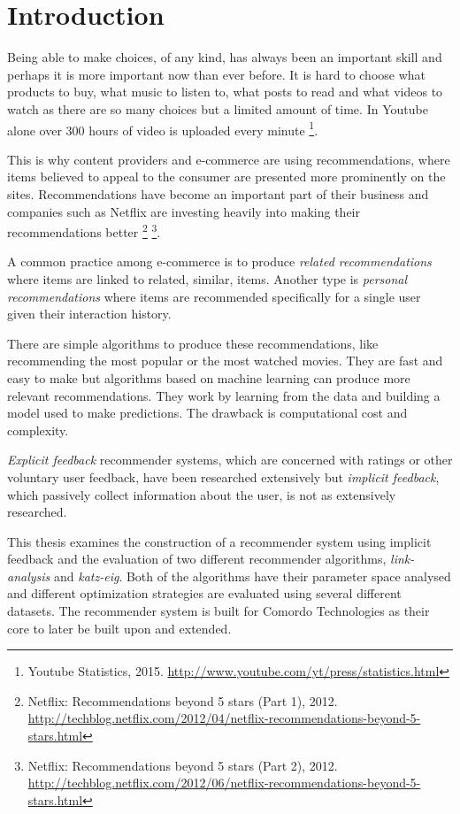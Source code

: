 
\section{Introduction}\label{sec:intro:intro}

Being able to make choices, of any kind, has always been an important skill and perhaps it is more important now than ever before. It is hard to choose what products to buy, what music to listen to, what posts to read and what videos to watch as there are so many choices but a limited amount of time. In Youtube alone over 300 hours of video is uploaded every minute
\footnote{Youtube Statistics, 2015. \url{http://www.youtube.com/yt/press/statistics.html}}.

This is why content providers and e-commerce are using recommendations, where items believed to appeal to the consumer are presented more prominently on the sites. Recommendations have become an important part of their business and companies such as Netflix are investing heavily into making their recommendations better
\footnote{
Netflix: Recommendations beyond 5 stars (Part 1), 2012.
\url{http://techblog.netflix.com/2012/04/netflix-recommendations-beyond-5-stars.html}
}
\footnote{
Netflix: Recommendations beyond 5 stars (Part 2), 2012.
\url{http://techblog.netflix.com/2012/06/netflix-recommendations-beyond-5-stars.html}
}.

A common practice among e-commerce is to produce \textit{related recommendations} where items are linked to related, similar, items. Another type is \textit{personal recommendations} where items are recommended specifically for a single user given their interaction history.

There are simple algorithms to produce these recommendations, like recommending the most popular or the most watched movies. They are fast and easy to make but algorithms based on machine learning can produce more relevant recommendations. They work by learning from the data and building a model used to make predictions. The drawback is computational cost and complexity.

\textit{Explicit feedback} recommender systems, which are concerned with ratings or other voluntary user feedback, have been researched extensively but \textit{implicit feedback}, which passively collect information about the user, is not as extensively researched. \citep{hu2008collaborative, bobadilla2013recommender}

This thesis examines the construction of a recommender system using implicit feedback and the evaluation of two different recommender algorithms, \textit{link-analysis} and \textit{katz-eig}. Both of the algorithms have their parameter space analysed and different optimization strategies are evaluated using several different datasets. The recommender system is built for Comordo Technologies as their core to later be built upon and extended.

